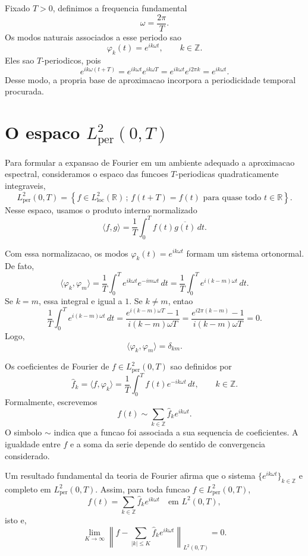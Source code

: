 Fixado \(T>0\), definimos a frequencia fundamental
\[
\omega=\frac{2\pi}{T}.
\]
Os modos naturais associados a esse periodo sao
\[
\varphi_k(t)=e^{ik\omega t}, \qquad k\in\mathbb{Z}.
\]
Eles sao \(T\)-periodicos, pois
\[
e^{ik\omega(t+T)}
=e^{ik\omega t}e^{ik\omega T}
=e^{ik\omega t}e^{i2\pi k}
=e^{ik\omega t}.
\]
Desse modo, a propria base de aproximacao incorpora a periodicidade temporal
procurada.

\section{O espaco \texorpdfstring{\(L^2_{\mathrm{per}}(0,T)\)}{L2per(0,T)}}

Para formular a expansao de Fourier em um ambiente adequado a aproximacao
espectral, consideramos o espaco das funcoes \(T\)-periodicas quadraticamente
integraveis,
\[
L^2_{\mathrm{per}}(0,T)=
\left\{
f\in L^2_{\mathrm{loc}}(\mathbb{R})\,;\,
f(t+T)=f(t) \text{ para quase todo } t\in\mathbb{R}
\right\}.
\]
Nesse espaco, usamos o produto interno normalizado
\[
\langle f,g\rangle
=
\frac{1}{T}\int_0^T f(t)\overline{g(t)}\,dt.
\]

Com essa normalizacao, os modos \(\varphi_k(t)=e^{ik\omega t}\) formam um
sistema ortonormal. De fato,
\[
\langle \varphi_k,\varphi_m\rangle
=
\frac{1}{T}\int_0^T e^{ik\omega t}e^{-im\omega t}\,dt
=
\frac{1}{T}\int_0^T e^{i(k-m)\omega t}\,dt.
\]
Se \(k=m\), essa integral e igual a \(1\). Se \(k\neq m\), entao
\[
\frac{1}{T}\int_0^T e^{i(k-m)\omega t}\,dt
=
\frac{e^{i(k-m)\omega T}-1}{i(k-m)\omega T}
=
\frac{e^{i2\pi(k-m)}-1}{i(k-m)\omega T}
=0.
\]
Logo,
\[
\langle \varphi_k,\varphi_m\rangle=\delta_{km}.
\]

Os coeficientes de Fourier de \(f\in L^2_{\mathrm{per}}(0,T)\) sao definidos por
\[
\widehat f_k
=
\langle f,\varphi_k\rangle
=
\frac{1}{T}\int_0^T f(t)e^{-ik\omega t}\,dt,
\qquad k\in\mathbb{Z}.
\]
Formalmente, escrevemos
\[
f(t)\sim \sum_{k\in\mathbb{Z}}\widehat f_k e^{ik\omega t}.
\]
O simbolo \(\sim\) indica que a funcao foi associada a sua sequencia de
coeficientes. A igualdade entre \(f\) e a soma da serie depende do sentido de
convergencia considerado.

Um resultado fundamental da teoria de Fourier afirma que o sistema
\(\{e^{ik\omega t}\}_{k\in\mathbb{Z}}\) e completo em
\(L^2_{\mathrm{per}}(0,T)\). Assim, para toda funcao
\(f\in L^2_{\mathrm{per}}(0,T)\),
\[
f(t)=\sum_{k\in\mathbb{Z}}\widehat f_k e^{ik\omega t}
\quad\text{em } L^2(0,T),
\]
isto e,
\[
\lim_{K\to\infty}
\left\|
f-
\sum_{|k|\le K}\widehat f_k e^{ik\omega t}
\right\|_{L^2(0,T)}
=0.
\]

